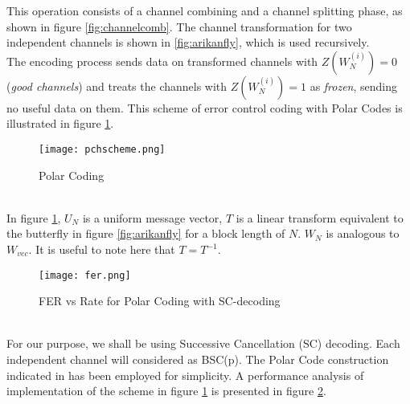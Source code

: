 \documentclass[
11pt, %
a4paper, %
oneside, %
headinclude,footinclude, %
BCOR5mm, %
]{scrartcl}
\begin{document}
This operation consists of a channel combining and a channel splitting phase, as shown in figure \ref{fig:channelcomb}. The channel transformation for two independent channels is shown in \ref{fig:arikanfly}, which is used recursively. \\The encoding process sends data on transformed channels with $Z(W^{(i)}_N)=0$  (\emph{good channels}) and treats the channels with $Z(W^{(i)}_N)=1$ as \emph{frozen}, sending no useful data on them. This scheme of error control coding with Polar Codes is illustrated in figure \ref{fig:pchscheme}.
\begin{figure}[h]
 \begin{center}
    \texttt{[image: pchscheme.png]}
  \end{center}
  \caption{Polar Coding}
  \label{fig:pchscheme}
\end{figure}\\
In figure \ref{fig:pchscheme}, $U_N$ is a uniform message vector, $T$ is a linear transform equivalent to the butterfly in figure \ref{fig:arikanfly} for a block length of $N$. $W_N$ is analogous to $W_{vec}$. It is useful to note here that $T=T^{-1}$.
\begin{figure}[h]
  \begin{center}
    \texttt{[image: fer.png]}
  \end{center}
  \caption{FER vs Rate for Polar Coding with SC-decoding}
  \label{fig:fer}
\end{figure}\\
For our purpose, we shall be using Successive Cancellation (SC) decoding. Each independent channel will considered as BSC(p). The Polar Code construction indicated in \cite{zhang} has been employed for simplicity. A performance analysis of implementation of the scheme in figure \ref{fig:pchscheme} is presented in figure \ref{fig:fer}.   
\end{document}
